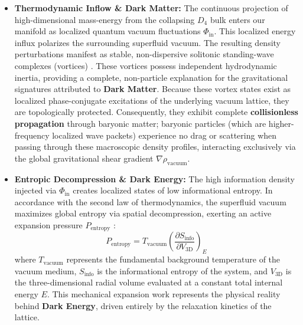 \documentclass[twocolumn]{aa}
\begin{document}
\begin{itemize}
    \item \textbf{Thermodynamic Inflow \& Dark Matter:} The continuous projection of high-dimensional mass-energy from the collapsing $D_4$ bulk enters our manifold as localized quantum vacuum fluctuations $\Phi_{\text{in}}$. This localized energy influx polarizes the surrounding superfluid vacuum. The resulting density perturbations manifest as stable, non-dispersive solitonic standing-wave complexes (vortices) \cite{volovik2003}. These vortices possess independent hydrodynamic inertia, providing a complete, non-particle explanation for the gravitational signatures attributed to \textbf{Dark Matter}. Because these vortex states exist as localized phase-conjugate excitations of the underlying vacuum lattice, they are topologically protected. Consequently, they exhibit complete \textbf{collisionless propagation} through baryonic matter; baryonic particles (which are higher-frequency localized wave packets) experience no drag or scattering when passing through these macroscopic density profiles, interacting exclusively via the global gravitational shear gradient $\nabla\rho_{\text{vacuum}}$.
    
    \vspace{1em}

    \item \textbf{Entropic Decompression \& Dark Energy:} The high information density injected via $\Phi_{\text{in}}$ creates localized states of low informational entropy. In accordance with the second law of thermodynamics, the superfluid vacuum maximizes global entropy via spatial decompression, exerting an active expansion pressure $P_{\text{entropy}}$ \cite{verlinde2011}:
    \begin{equation}
    P_{\text{entropy}} = T_{\text{vacuum}} \left( \frac{\partial S_{\text{info}}}{\partial V_{\text{3D}}} \right)_E
    \end{equation}
    where $T_{\text{vacuum}}$ represents the fundamental background temperature of the vacuum medium, $S_{\text{info}}$ is the informational entropy of the system, and $V_{\text{3D}}$ is the three-dimensional radial volume evaluated at a constant total internal energy $E$. This mechanical expansion work represents the physical reality behind \textbf{Dark Energy}, driven entirely by the relaxation kinetics of the lattice.
    
    \vspace{1em}


\end{itemize}
\end{document}
